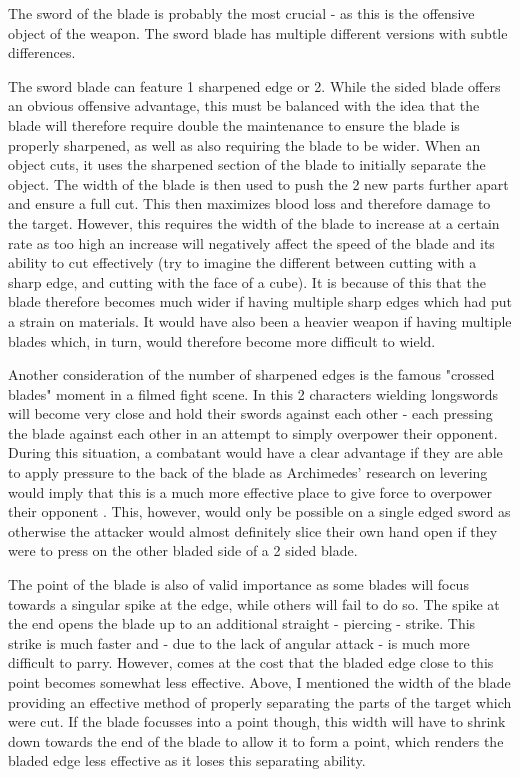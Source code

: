 \documentclass{article}
\begin{document}
The sword of the blade is probably the most crucial - as this is the offensive object of the weapon. The sword blade has multiple different versions with subtle differences.

The sword blade can feature 1 sharpened edge or 2. While the sided blade offers an obvious offensive advantage, this must be balanced with the idea that the blade will therefore require double the maintenance to ensure the blade is properly sharpened, as well as also requiring the blade to be wider. When an object cuts, it uses the sharpened section of the blade to initially separate the object. The width of the blade is then used to push the 2 new parts further apart and ensure a full cut. This then maximizes blood loss and therefore damage to the target. However, this requires the width of the blade to increase at a certain rate as too high an increase will negatively affect the speed of the blade and its ability to cut effectively (try to imagine the different between cutting with a sharp edge, and cutting with the face of a cube). It is because of this that the blade therefore becomes much wider if having multiple sharp edges which had put a strain on materials. It would have also been a heavier weapon if having multiple blades which, in turn, would therefore become more difficult to wield.

Another consideration of the number of sharpened edges is the famous "crossed blades" moment in a filmed fight scene. In this 2 characters wielding longswords will become very close and hold their swords against each other - each pressing the blade against each other in an attempt to simply overpower their opponent. During this situation, a combatant would have a clear advantage if they are able to apply pressure to the back of the blade as Archimedes' research on levering would imply that this is a much more effective place to give force to overpower their opponent \parencite{bunn2017archimedes}. This, however, would only be possible on a single edged sword as otherwise the attacker would almost definitely slice their own hand open if they were to press on the other bladed side of a 2 sided blade.

The point of the blade is also of valid importance as some blades will focus towards a singular spike at the edge, while others will fail to do so. The spike at the end opens the blade up to an additional straight - piercing - strike. This strike is much faster and - due to the lack of angular attack - is much more difficult to parry. However, comes at the cost that the bladed edge close to this point becomes somewhat less effective. Above, I mentioned the width of the blade providing an effective method of properly separating the parts of the target which were cut. If the blade focusses into a point though, this width will have to shrink down towards the end of the blade to allow it to form a point, which renders the bladed edge less effective as it loses this separating ability.
\end{document}
